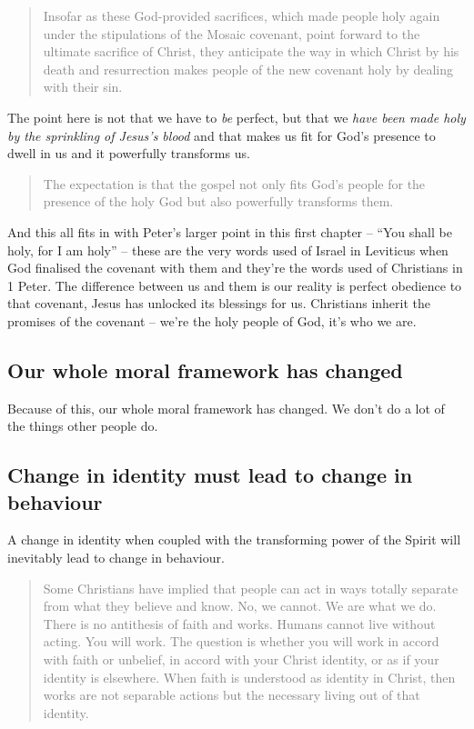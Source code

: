 \begin{quote}
    \textcolor{gray}{%
        Insofar as these God-provided sacrifices, which made people holy again
        under the stipulations of the Mosaic covenant, point forward to the
        ultimate sacrifice of Christ, they anticipate the way in which Christ by
        his death and resurrection makes people of the new covenant holy by
        dealing with their sin.
        \autocite[1018]{carson:2007}
    }
\end{quote}

The point here is not that we have to \textit{be} perfect, but that we
\textit{have been made holy by the sprinkling of Jesus's blood} and that makes
us fit for God's presence to dwell in us and it powerfully transforms us.

\begin{quote}
    \textcolor{gray}{%
        The expectation is that the gospel not only fits God's people for the
        presence of the holy God but also powerfully transforms them.
        \autocite[1018]{carson:2007}
    }
\end{quote}

And this all fits in with Peter's larger point in this first chapter --
\enquote{You shall be holy, for I am holy} -- these are the very words used of
Israel in Leviticus when God finalised the covenant with them and they're the
words used of Christians in 1 Peter. The difference between us and them is our
reality is perfect obedience to that covenant, Jesus has unlocked its blessings
for us. Christians inherit the promises of the covenant – we're the holy people
of God, it's who we are.

\subsection{Our whole moral framework has changed}

Because of this, our whole moral framework has changed. We don't do a lot of the
things other people do.

\subsection{Change in identity must lead to change in behaviour}

A change in identity when coupled with the transforming power of the Spirit will
inevitably lead to change in behaviour.

\begin{quote}
    \textcolor{gray}{%
        Some Christians have implied that people can act in ways totally
        separate from what they believe and know. No, we cannot. We are what we
        do. There is no antithesis of faith and works. Humans cannot live
        without acting. You will work. The question is whether you will work in
        accord with faith or unbelief, in accord with your Christ identity, or
        as if your identity is elsewhere. When faith is understood as identity
        in Christ, then works are not separable actions but the necessary living
        out of that identity.
        \autocite[16]{snodgrass:2011}
    }
\end{quote}

